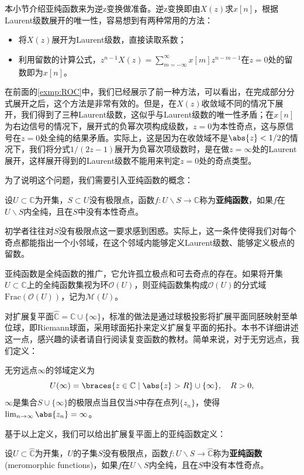 本小节介绍亚纯函数来为逆z变换做准备。逆z变换即由$X(z)$求$x[n]$，根据Laurent级数展开的唯一性，容易想到有两种常用的方法：
\begin{itemize}
    \item 将$X(z)$展开为Laurent级数，直接读取系数；
    \item 利用留数的计算公式，$z^{n-1}X(z)=\sum_{m=-\infty}^{\infty}x[m]z^{n-m-1}$在$z=0$处的留数即为$x[n]$。
\end{itemize}

在前面的\cref{exmp:ROC}中，我们已经展示了前一种方法，可以看出，在完成部分分式展开之后，这个方法是非常有效的。但是，在$X(z)$收敛域不同的情况下展开，我们得到了三种Laurent级数，这似乎与Laurent级数的唯一性矛盾；在$x[n]$为右边信号的情况下，展开式的负幂次项构成级数，$z=0$为本性奇点，这与原信号在$z=0$处全纯的结果矛盾。实际上，这是因为在收敛域不是$\abs{z}<1/2$的情况下，我们将分式$1/(2z-1)$展开为负幂次项级数时，是在做$z=\infty$处的Laurent展开，这样展开得到的Laurent级数不能用来判定$z=0$处的奇点类型。

为了说明这个问题，我们需要引入亚纯函数的概念\cite{Function_Theory}：
\begin{definition}[亚纯函数]
    设$U\subset\mathbb{C}$为开集，$S\subset U$没有极限点，函数$f:U\backslash S\to\mathbb{C}$称为\textbf{亚纯函数}，如果$f$在$U\backslash S$内全纯，且在$S$中没有本性奇点。
\end{definition}

初学者往往对$S$没有极限点这一要求感到困惑。实际上，这一条件使得我们对每个奇点都能指出一个小邻域，在这个邻域内能够定义Laurent级数、能够定义极点的留数。

亚纯函数是全纯函数的推广，它允许孤立极点和可去奇点的存在。如果将开集$U\subset\mathbb{C}$上的全纯函数集视为环$\mathcal{O}(U)$，则亚纯函数集构成$\mathcal{O}(U)$的分式域$\mathrm{Frac}(\mathcal{O}(U))$，记为$\mathcal{M}(U)$。

对扩展复平面$\hat{\mathbb{C}}=\mathbb{C}\cup\{\infty\}$，标准的做法是通过球极投影将扩展平面同胚映射至单位球，即Riemann球面，采用球面拓扑来定义扩展复平面的拓扑。本书不详细讲述这一点，感兴趣的读者请自行阅读复变函数的教材。简单来说，对于无穷远点，我们定义：
\begin{definition}[无穷远点的邻域]
    无穷远点$\infty$的邻域定义为
    \begin{equation}
        U(\infty)=\braces{z\in\mathbb{C}\mid\abs{z}>R}\cup\{\infty\},\quad R>0,
    \end{equation}
    $\infty$是集合$S\cup\{\infty\}$的极限点当且仅当$S$中存在点列$\{z_n\}$，使得$\lim_{n\to\infty}\abs{z_n}=\infty$。
\end{definition}
基于以上定义，我们可以给出扩展复平面上的亚纯函数定义：
\begin{definition}[扩展复平面上的亚纯函数]
    设$U\subset\hat{\mathbb{C}}$为开集，$U$的子集$S$没有极限点，函数$f:U\backslash S\to\hat{\mathbb{C}}$称为\textbf{亚纯函数}(meromorphic functions)，如果$f$在$U\backslash S$内全纯，且在$S$中没有本性奇点。
\end{definition}

